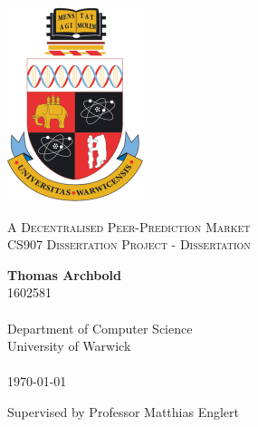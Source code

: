 \documentclass[10pt,a4paper]{article}
\theoremstyle{plain}
\theoremstyle{definition}
\begin{document}
\begin{titlepage}
    \begin{center}

        \vspace*{2cm}
        \includegraphics[width=.25\textwidth]{crest.png}

        \vspace*{1cm}
		{\Large \textsc{A Decentralised Peer-Prediction Market}} \\
		{\textsc{CS907 Dissertation Project - Dissertation}}

        \vspace*{1cm}
        \textbf{Thomas Archbold} \\
		1602581 \\~\\
        Department of Computer Science \\
        University of Warwick \\~\\

		\today

		\vspace*{1cm}

		Supervised by Professor Matthias Englert

        \vfill

    \end{center}
\end{titlepage}

% 
%
\end{document}
